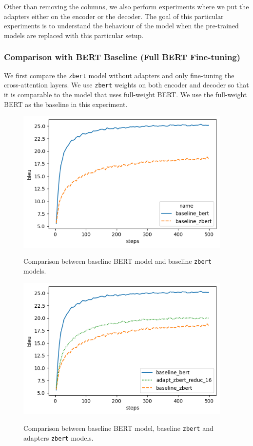 Other than removing the columns, we also perform experiments where we put the adapters either on the encoder or the decoder. The goal of this particular experiments is to understand the behaviour of the model when the pre-trained models are replaced with this particular setup.

\subsubsection{Comparison with BERT Baseline (Full BERT Fine-tuning)}
We first compare the \texttt{zbert} model without adapters and only fine-tuning the cross-attention layers. We use \texttt{zbert} weights on both encoder and decoder so that it is comparable to the model that uses full-weight BERT. We use the full-weight BERT as the baseline in this experiment.

\begin{figure}[]
    {\includegraphics[width=0.95\textwidth]{img/baseline_zbert.png}}
    \centering
    \caption{Comparison between baseline BERT model and baseline \texttt{zbert} models.}
    \label{img:baseline_zbert}
\end{figure}

\begin{figure}[]
    {\includegraphics[width=0.95\textwidth]{img/adapter_zbert.png}}
    \centering
    \caption{Comparison between baseline BERT model, baseline \texttt{zbert} and adapters \texttt{zbert} models.}
    \label{img:adapter_zbert}
\end{figure}


